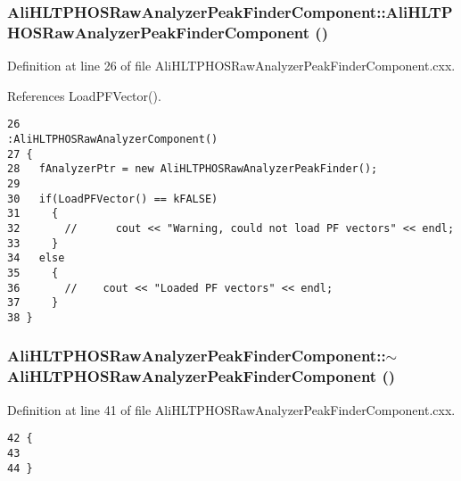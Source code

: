 \subsubsection{\setlength{\rightskip}{0pt plus 5cm}Ali\-HLTPHOSRaw\-Analyzer\-Peak\-Finder\-Component::Ali\-HLTPHOSRaw\-Analyzer\-Peak\-Finder\-Component ()}\label{classAliHLTPHOSRawAnalyzerPeakFinderComponent_a0}




Definition at line 26 of file Ali\-HLTPHOSRaw\-Analyzer\-Peak\-Finder\-Component.cxx.

References Load\-PFVector().

\footnotesize\begin{verbatim}26                                                                                   :AliHLTPHOSRawAnalyzerComponent()
27 {
28   fAnalyzerPtr = new AliHLTPHOSRawAnalyzerPeakFinder();
29 
30   if(LoadPFVector() == kFALSE)
31     {
32       //      cout << "Warning, could not load PF vectors" << endl;
33     }
34   else 
35     {
36       //    cout << "Loaded PF vectors" << endl;
37     }
38 } 
\end{verbatim}\normalsize 


\subsubsection{\setlength{\rightskip}{0pt plus 5cm}Ali\-HLTPHOSRaw\-Analyzer\-Peak\-Finder\-Component::$\sim${\bf Ali\-HLTPHOSRaw\-Analyzer\-Peak\-Finder\-Component} ()}\label{classAliHLTPHOSRawAnalyzerPeakFinderComponent_a1}




Definition at line 41 of file Ali\-HLTPHOSRaw\-Analyzer\-Peak\-Finder\-Component.cxx.

\footnotesize\begin{verbatim}42 {
43 
44 }
\end{verbatim}\normalsize 


